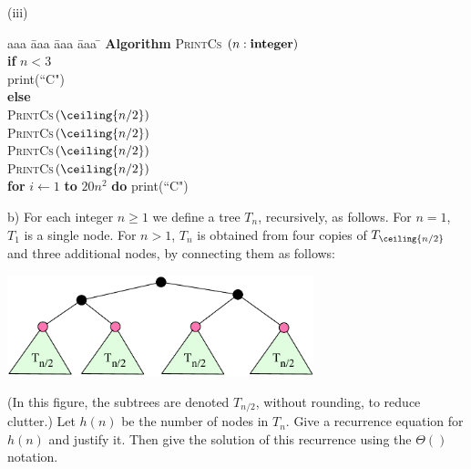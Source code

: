 \documentclass{article}
\begin{document}
\begin{problem}
\bigskip
\noindent
(iii)\ \ 
\begin{minipage}[t]{3in}
\begin{tabbing}
aaa \= aaa \= aaa \= aaa \=  \kill
\textbf{Algorithm} \textsc{PrintCs} $(n: \mbox{\bf integer})$ \\
          \> \textbf{if} $n < 3$ \\
          \>\>  print(``C") \\
          \>\textbf{else} \\
          \>\>  \textsc{PrintCs}$(\ceiling{n/2})$\\
          \>\>  \textsc{PrintCs}$(\ceiling{n/2})$\\
          \>\>  \textsc{PrintCs}$(\ceiling{n/2})$\\
          \>\>  \textsc{PrintCs}$(\ceiling{n/2})$\\
      \>\> \textbf{for} $i \leftarrow 1$ \textbf{to} $20n^2$ \textbf{do} print(``C")
\end{tabbing}
\end{minipage}

\bigskip
\noindent
b) For each integer $n \ge 1$ we define a tree $T_n$, recursively, as follows. For $n=1$, $T_1$ is
a single node. For $n > 1$, $T_n$ is obtained from four copies of $T_{\ceiling{n/2}}$ and three
additional nodes, by connecting them as follows:
%
\begin{center}
\includegraphics[width=3.5in]{treeforhw4.pdf}
\end{center}
%
(In this figure, the subtrees are denoted $T_{n/2}$, without rounding, to reduce clutter.)
Let $h(n)$ be the number of nodes in $T_n$. Give a recurrence equation for $h(n)$ and
justify it. Then give the solution of this recurrence  using the $\Theta()$ notation.
\end{problem}
\end{document}
